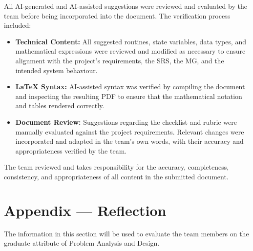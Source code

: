 \documentclass[12pt, titlepage]{article}
\begin{document}

All AI-generated and AI-assisted suggestions were reviewed and evaluated by the team before being incorporated into the document.
The verification process included:
\begin{itemize}
    \item \textbf{Technical Content:} All suggested routines, state variables, data types, and mathematical
    expressions were reviewed and modified as necessary to ensure alignment with the project's requirements, the SRS, the MG, and the intended system behaviour.
    \item \textbf{LaTeX Syntax:} AI-assisted syntax was verified by compiling the document and
    inspecting the resulting PDF to ensure that the mathematical notation and tables rendered correctly.
    \item \textbf{Document Review:} Suggestions regarding the checklist and rubric were manually evaluated
    against the project requirements. Relevant changes were incorporated and adapted in the team's own words,
    with their accuracy and appropriateness verified by the team.
\end{itemize}

The team reviewed and takes responsibility for the accuracy, completeness, consistency, and appropriateness
of all content in the submitted document.

\newpage{}

\section{Appendix --- Reflection}

The information in this section will be used to evaluate the team members on the
graduate attribute of Problem Analysis and Design.
\end{document}
